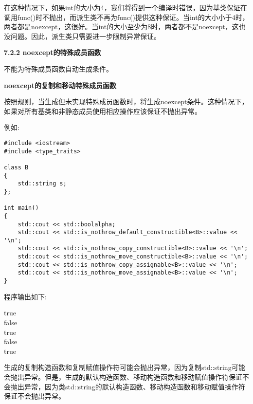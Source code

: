 在这种情况下，如果int的大小为4，我们将得到一个编译时错误，因为基类保证在调用func()时不抛出，而派生类不再为func()提供这种保证。当int的大小小于4时，两者都是noexcept，这很好。当int的大小至少为8时，两者都不是noexcept，这也没问题。因此，派生类只需要进一步限制异常保证。\par

\hspace*{\fill} \par %
\textbf{7.2.2 noexcept的特殊成员函数}

不能为特殊成员函数自动生成条件。\par

\hspace*{\fill} \par %
\textbf{noexcept的复制和移动特殊成员函数}

按照规则，当生成但未实现特殊成员函数时，将生成noexcept条件。这种情况下，如果对所有基类和非静态成员使用相应操作应该保证不抛出异常。\par

例如:\par

{\color{red}{basics/specialnoexcept.cpp}}\par

\begin{lstlisting}[caption={}]
#include <iostream>
#include <type_traits>

class B
{
	std::string s;
};

int main()
{
	std::cout << std::boolalpha;
	std::cout << std::is_nothrow_default_constructible<B>::value << '\n';
	std::cout << std::is_nothrow_copy_constructible<B>::value << '\n';
	std::cout << std::is_nothrow_move_constructible<B>::value << '\n';
	std::cout << std::is_nothrow_copy_assignable<B>::value << '\n';
	std::cout << std::is_nothrow_move_assignable<B>::value << '\n';
}
\end{lstlisting}

程序输出如下:\par

\begin{tcolorbox}[colback=white,colframe=black]
true \\
false \\
true \\ 
false \\
true 
\end{tcolorbox}

生成的复制构造函数和复制赋值操作符可能会抛出异常，因为复制std::string可能会抛出异常。但是，生成的默认构造函数、移动构造函数和移动赋值操作符保证不会抛出异常，因为类std::string的默认构造函数、移动构造函数和移动赋值操作符保证不会抛出异常。\par

